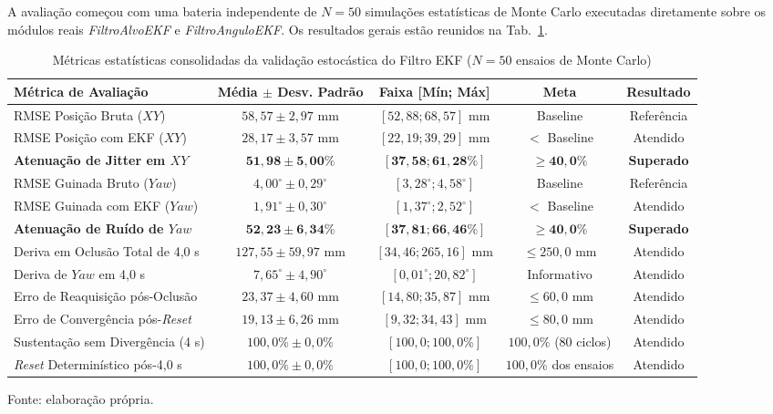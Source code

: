A avaliação começou com uma bateria independente de $N = 50$ simulações estatísticas de Monte Carlo executadas diretamente sobre os módulos reais \textit{FiltroAlvoEKF} e \textit{FiltroAnguloEKF}. Os resultados gerais estão reunidos na Tab.~\ref{tab:validacao_ekf_resultados}.

\begin{table}[H]
	\centering
	\footnotesize
	\setlength{\tabcolsep}{2pt}
	\captionsetup{justification=centering}
	\caption{Métricas estatísticas consolidadas da validação estocástica do Filtro EKF ($N = 50$ ensaios de Monte Carlo)}
	\label{tab:validacao_ekf_resultados}
	\vspace{0.2cm}
	\begin{tabular}{>{\raggedright\arraybackslash}p{3.8cm}cccc}
		\hline
		\textbf{Métrica de Avaliação} & \textbf{Média $\pm$ Desv. Padrão} & \textbf{Faixa [Mín; Máx]} & \textbf{Meta} & \textbf{Resultado} \\
		\hline
		RMSE Posição Bruta ($XY$) & $58,57 \pm 2,97\text{ mm}$ & $[52,88; 68,57]\text{ mm}$ & Baseline & Referência \\
		RMSE Posição com EKF ($XY$) & $28,17 \pm 3,57\text{ mm}$ & $[22,19; 39,29]\text{ mm}$ & $<$ Baseline & Atendido \\
		\textbf{Atenuação de Jitter em $XY$} & $\mathbf{51,98 \pm 5,00\%}$ & $[\mathbf{37,58; 61,28\%}]$ & $\mathbf{\ge 40,0\%}$ & \textbf{Superado} \\
		RMSE Guinada Bruto ($Yaw$) & $4,00^\circ \pm 0,29^\circ$ & $[3,28^\circ; 4,58^\circ]$ & Baseline & Referência \\
		RMSE Guinada com EKF ($Yaw$) & $1,91^\circ \pm 0,30^\circ$ & $[1,37^\circ; 2,52^\circ]$ & $<$ Baseline & Atendido \\
		\textbf{Atenuação de Ruído de $Yaw$} & $\mathbf{52,23 \pm 6,34\%}$ & $[\mathbf{37,81; 66,46\%}]$ & $\mathbf{\ge 40,0\%}$ & \textbf{Superado} \\
		Deriva em Oclusão Total de 4,0 s & $127,55 \pm 59,97\text{ mm}$ & $[34,46; 265,16]\text{ mm}$ & $\le 250,0\text{ mm}$ & Atendido \\
		Deriva de $Yaw$ em 4,0 s & $7,65^\circ \pm 4,90^\circ$ & $[0,01^\circ; 20,82^\circ]$ & Informativo & Atendido \\
		Erro de Reaquisição pós-Oclusão & $23,37 \pm 4,60\text{ mm}$ & $[14,80; 35,87]\text{ mm}$ & $\le 60,0\text{ mm}$ & Atendido \\
		Erro de Convergência pós-\textit{Reset} & $19,13 \pm 6,26\text{ mm}$ & $[9,32; 34,43]\text{ mm}$ & $\le 80,0\text{ mm}$ & Atendido \\
		Sustentação sem Divergência (4 s) & $100,0\% \pm 0,0\%$ & $[100,0; 100,0\%]$ & $100,0\%$ (80 ciclos) & Atendido \\
		\textit{Reset} Determinístico pós-4,0 s & $100,0\% \pm 0,0\%$ & $[100,0; 100,0\%]$ & $100,0\%$ dos ensaios & Atendido \\
		\hline
	\end{tabular}
	\vspace{0.2cm}
	\begin{flushleft}
		\footnotesize Fonte: elaboração própria.
	\end{flushleft}
\end{table}


